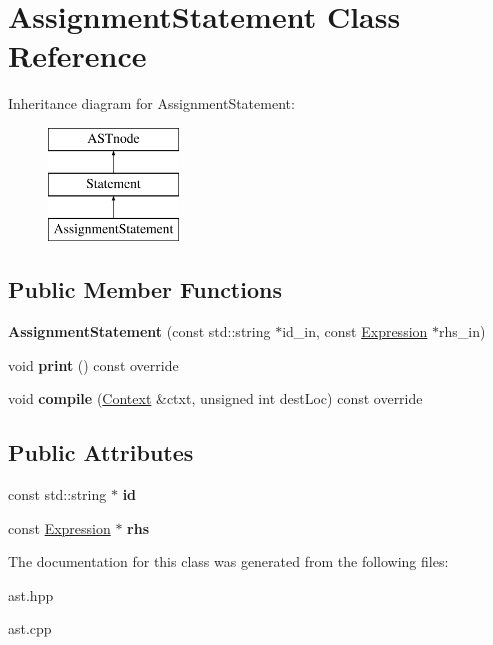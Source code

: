 \hypertarget{class_assignment_statement}{}\section{Assignment\+Statement Class Reference}
\label{class_assignment_statement}
Inheritance diagram for Assignment\+Statement\+:\begin{figure}[H]
\begin{center}
\leavevmode
\includegraphics[height=3.000000cm]{class_assignment_statement}
\end{center}
\end{figure}
\subsection*{Public Member Functions}
\begin{DoxyCompactItemize}
\item 
\mbox{\label{class_assignment_statement_ab4a99d38ed28b1d6be8274f3118ddce4}} 
{\bfseries Assignment\+Statement} (const std\+::string $\ast$id\+\_\+in, const \hyperlink{class_expression}{Expression} $\ast$rhs\+\_\+in)
\item 
\mbox{\label{class_assignment_statement_a8b312bb1c2b36f359a80b066c9e81c5a}} 
void {\bfseries print} () const override
\item 
\mbox{\label{class_assignment_statement_a8b297acc220822c0d490b67506645915}} 
void {\bfseries compile} (\hyperlink{class_context}{Context} \&ctxt, unsigned int dest\+Loc) const override
\end{DoxyCompactItemize}
\subsection*{Public Attributes}
\begin{DoxyCompactItemize}
\item 
\mbox{\label{class_assignment_statement_a78959d944a107ec14ea49639bd3cd473}} 
const std\+::string $\ast$ {\bfseries id}
\item 
\mbox{\label{class_assignment_statement_abc3f2374685ba365c72440b8c1c167bc}} 
const \hyperlink{class_expression}{Expression} $\ast$ {\bfseries rhs}
\end{DoxyCompactItemize}


The documentation for this class was generated from the following files\+:\begin{DoxyCompactItemize}
\item 
ast.\+hpp\item 
ast.\+cpp\end{DoxyCompactItemize}
